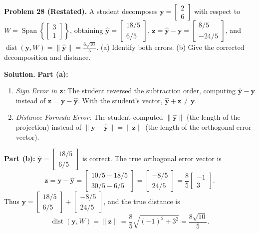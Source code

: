 \documentclass[11pt, letterpaper]{article}
\theoremstyle{definition}
\theoremstyle{remark}
\begin{document}
\medskip
\textbf{Problem 28 (Restated).} A student decomposes $\mathbf{y} = \begin{bmatrix} 2 \\ 6 \end{bmatrix}$ with respect to $W = \operatorname{Span}\left\{\begin{bmatrix} 3 \\ 1 \end{bmatrix}\right\}$, obtaining $\hat{\mathbf{y}} = \begin{bmatrix} 18/5 \\ 6/5 \end{bmatrix}$, $\mathbf{z} = \hat{\mathbf{y}} - \mathbf{y} = \begin{bmatrix} 8/5 \\ -24/5 \end{bmatrix}$, and $\operatorname{dist}(\mathbf{y}, W) = \|\hat{\mathbf{y}}\| = \frac{6\sqrt{10}}{5}$. (a) Identify both errors. (b) Give the corrected decomposition and distance.

\textbf{Solution.}
\textbf{Part (a):}
\begin{enumerate}
    \item \emph{Sign Error in $\mathbf{z}$:} The student reversed the subtraction order, computing $\hat{\mathbf{y}} - \mathbf{y}$ instead of $\mathbf{z} = \mathbf{y} - \hat{\mathbf{y}}$. With the student's vector, $\hat{\mathbf{y}} + \mathbf{z} \neq \mathbf{y}$.
    \item \emph{Distance Formula Error:} The student computed $\|\hat{\mathbf{y}}\|$ (the length of the projection) instead of $\|\mathbf{y} - \hat{\mathbf{y}}\| = \|\mathbf{z}\|$ (the length of the orthogonal error vector).
\end{enumerate}
\textbf{Part (b):} $\hat{\mathbf{y}} = \begin{bmatrix} 18/5 \\ 6/5 \end{bmatrix}$ is correct. The true orthogonal error vector is
\[
\mathbf{z} = \mathbf{y} - \hat{\mathbf{y}} = \begin{bmatrix} 10/5 - 18/5 \\ 30/5 - 6/5 \end{bmatrix} = \begin{bmatrix} -8/5 \\ 24/5 \end{bmatrix} = \frac{8}{5}\begin{bmatrix} -1 \\ 3 \end{bmatrix}.
\]
Thus $\mathbf{y} = \begin{bmatrix} 18/5 \\ 6/5 \end{bmatrix} + \begin{bmatrix} -8/5 \\ 24/5 \end{bmatrix}$, and the true distance is
\[
\operatorname{dist}(\mathbf{y}, W) = \|\mathbf{z}\| = \frac{8}{5}\sqrt{(-1)^2 + 3^2} = \frac{8\sqrt{10}}{5}.
\]
\end{document}
